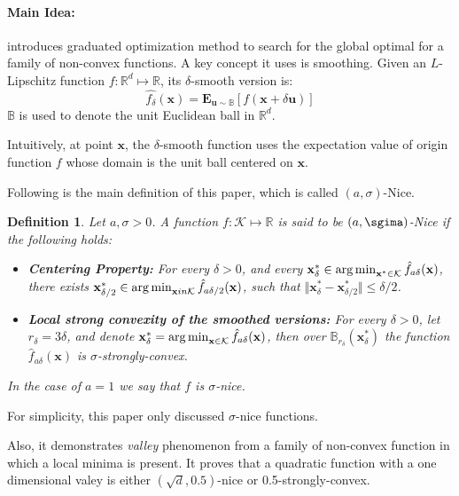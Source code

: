\paragraph{Main Idea:}
\cite{Hazan2015} introduces  graduated optimization method to search for the global optimal for a family of non-convex functions. A key concept it uses is smoothing. Given an $L$-Lipschitz function $f: \mathbb{R}^d \mapsto \mathbb{R}$, its $\delta$-smooth version is:
$$
\hat{f_\delta}(\mathbf{x}) = \mathbf{E}_{\mathbf{u}\sim\mathbb{B}}[f(\mathbf{x}+\delta\mathbf{u})]
$$
$\mathbb{B}$ is used to denote the unit Euclidean ball in $\mathbb{R}^d$. 

Intuitively, at point $\mathbf{x}$, the $\delta$-smooth function uses the expectation value of origin function $f$ whose domain is the unit ball centered on $\mathbf{x}$.

Following is the main definition of this paper, which is called $(a, \sigma)$-Nice.
\newtheorem{sigma-Nice}{Definition}
\begin{sigma-Nice}
Let $a, \sigma > 0$. A function $f: \mathcal{K} \mapsto \mathbb{R}$ is said to be $(a, \sgima)$-Nice if the following holds:
\begin{itemize}
    \item \textbf{Centering Property:} For every $\delta > 0$, and every $\mathbf{x}^*_\delta \in \operatorname*{arg\,min}_{\mathbf{x}^* \in \mathcal{K}} \hat{f}_{a\delta}(\mathbf{x})$, there exists $\mathbf{x}^*_{\delta/2} \in \operatorname*{arg\,min}_{\mathbf{x} in \mathcal{K}} \hat{f}_{a\delta/2}(\mathbf{x})$, such that $\Vert\mathbf{x}^*_{\delta} - \mathbf{x}^*_{\delta/2}\Vert \leq \delta/2$.
    \item \textbf{Local strong convexity of the smoothed versions:} For every $\delta > 0 $, let $r_\delta = 3\delta$, and denote $\mathbf{x}^*_{\delta} = \operatorname*{arg\,min}_{\mathbf{x} \in \mathcal{K}} \hat{f}_{a\delta}(\mathbf{x})$, then over $\mathbb{B}_{r_\delta}(\mathbf{x}^*_{\delta})$ the function $\hat{f}_{a\delta}(\mathbf{x})$ is $\sigma$-strongly-convex.
\end{itemize}
In the case of $a=1$ we say that $f$ is $\sigma$-nice.
\end{sigma-Nice}

For simplicity, this paper only discussed $\sigma$-nice functions. 

Also, it demonstrates \textit{valley} phenomenon from a family of non-convex function in which a local minima is present. It proves that a quadratic function with a one dimensional valey is either $(\sqrt{d}, 0.5)$-nice or 0.5-strongly-convex.

